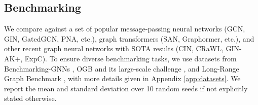 \documentclass{article}
\begin{document}
\subsection{Benchmarking \method}\label{sec:benchmarking}
We compare \method against a set of popular message-passing neural networks (GCN, GIN, GatedGCN, PNA, etc.), graph transformers (SAN, Graphormer, etc.), and other recent graph neural networks with SOTA results (CIN, CRaWL, GIN-AK+, ExpC). To ensure diverse benchmarking tasks, we use datasets from Benchmarking-GNNs \cite{dwivedi2020benchmarking}, OGB \cite{hu2020ogb} and its large-scale challenge \cite{hu2021ogblsc}, and Long-Range Graph Benchmark \cite{dwivedi2022LRGB}, with more details given in Appendix \ref{app:datasets}. We report the mean and standard deviation over 10 random seeds if not explicitly stated otherwise.
\end{document}
